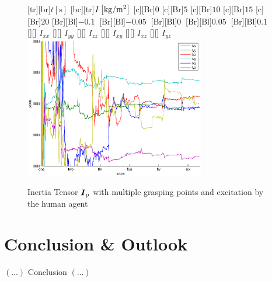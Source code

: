 \begin{figure}
	\centering	
	[tr][br]{$t\left[\mathrm{s}\right]$}
	[bc][tr]{$I\left[\mathrm{kg}/\mathrm{m}^2\right]$}
	[Br]{$0$}
	[Br]{$5$}
	[Br]{$10$}
	[Br]{$15$}
	[Br]{$20$}
	[Br][Bl]{$-0.1\  $}
	[Br][Bl]{$-0.05\ $}
	[Br][Bl]{$0\  $}
	[Br][Bl]{$0.05\  $}
	[Br][Bl]{$0.1\  $}
	[][]{\tiny \hspace{0.2cm} $I_{xx}$}
	[][]{\tiny \hspace{0.2cm} $I_{yy}$}
	[][]{\tiny \hspace{0.2cm} $I_{zz}$}
	[][]{\tiny \hspace{0.2cm} $I_{xy}$}
	[][]{\tiny \hspace{0.2cm} $I_{xz}$}
	[][]{\tiny \hspace{0.2cm} $I_{yz}$}
	\includegraphics[width=0.7\textwidth]{figures/multiple_grasping_points_human_inertias.eps}
	\vspace{0.2cm}
	\caption[Inertia errors, multiple grasping points, excitation by human agent]{Inertia Tensor $\boldsymbol{I}_{\mathrm{p}}$ with multiple grasping points and excitation by the human agent}
	\label{fig:estim_inertia_multi_human}
\end{figure}

\chapter{Conclusion \& Outlook}

$\left(...\right)$ Conclusion $\left(...\right)$


